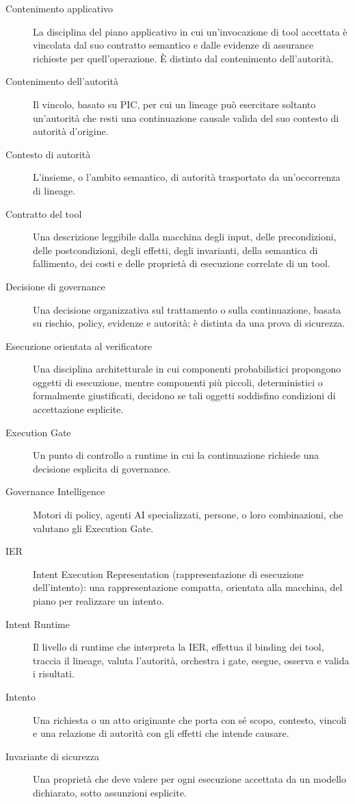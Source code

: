 \documentclass[10pt,oneside,openany]{book}
\begin{document}
\begin{description}
\item[Contenimento applicativo] La disciplina del piano applicativo in cui un'invocazione di tool accettata è vincolata dal suo contratto semantico e dalle evidenze di assurance richieste per quell'operazione. È distinto dal contenimento dell'autorità.
\item[Contenimento dell'autorità] Il vincolo, basato su PIC, per cui un lineage può esercitare soltanto un'autorità che resti una continuazione causale valida del suo contesto di autorità d'origine.
\item[Contesto di autorità] L'insieme, o l'ambito semantico, di autorità trasportato da un'occorrenza di lineage.
\item[Contratto del tool] Una descrizione leggibile dalla macchina degli input, delle precondizioni, delle postcondizioni, degli effetti, degli invarianti, della semantica di fallimento, dei costi e delle proprietà di esecuzione correlate di un tool.
\item[Decisione di governance] Una decisione organizzativa sul trattamento o sulla continuazione, basata su rischio, policy, evidenze e autorità; è distinta da una prova di sicurezza.
\item[Esecuzione orientata al verificatore] Una disciplina architetturale in cui componenti probabilistici propongono oggetti di esecuzione, mentre componenti più piccoli, deterministici o formalmente giustificati, decidono se tali oggetti soddisfino condizioni di accettazione esplicite.
\item[Execution Gate] Un punto di controllo a runtime in cui la continuazione richiede una decisione esplicita di governance.
\item[Governance Intelligence] Motori di policy, agenti AI specializzati, persone, o loro combinazioni, che valutano gli Execution Gate.
\item[IER] Intent Execution Representation (rappresentazione di esecuzione dell'intento): una rappresentazione compatta, orientata alla macchina, del piano per realizzare un intento.
\item[Intent Runtime] Il livello di runtime che interpreta la IER, effettua il binding dei tool, traccia il lineage, valuta l'autorità, orchestra i gate, esegue, osserva e valida i risultati.
\item[Intento] Una richiesta o un atto originante che porta con sé scopo, contesto, vincoli e una relazione di autorità con gli effetti che intende causare.
\item[Invariante di sicurezza] Una proprietà che deve valere per ogni esecuzione accettata da un modello dichiarato, sotto assunzioni esplicite.

\end{description}
\end{document}
